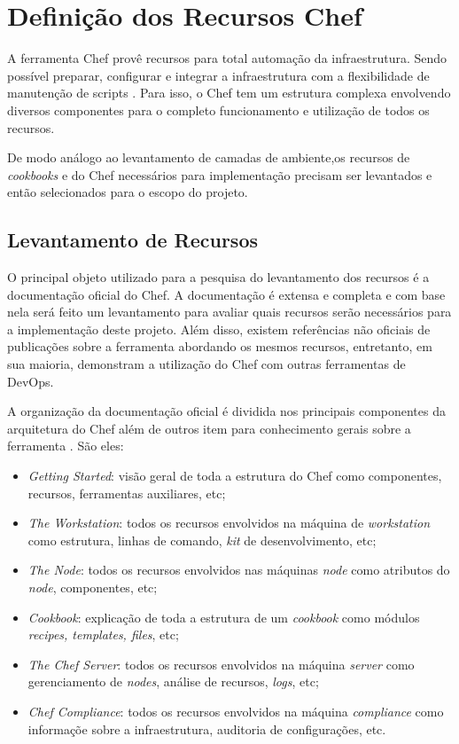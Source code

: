 \section{Definição dos Recursos Chef}
\label{sec:rec-chef}

A ferramenta Chef provê recursos para total automação da infraestrutura.
Sendo possível preparar, configurar e integrar a infraestrutura com a
flexibilidade de manutenção de scripts \cite{sharma:2015}. Para isso, o
Chef tem um estrutura complexa envolvendo diversos componentes para
o completo funcionamento e utilização de todos os recursos.

De modo análogo ao levantamento de camadas de ambiente,os recursos
de \textit{cookbooks} e do Chef necessários para implementação precisam
ser levantados e então selecionados para o escopo do projeto.

\subsection{Levantamento de Recursos}
\label{sec:levn-rec}

O principal objeto utilizado para a pesquisa do levantamento dos recursos
é a documentação oficial do Chef. A documentação é extensa e completa e
com base nela será feito um levantamento para avaliar quais recursos
serão necessários para a implementação deste projeto. Além disso, existem
referências não oficiais de publicações sobre a ferramenta abordando os
mesmos recursos, entretanto, em sua maioria, demonstram a utilização do
Chef com outras ferramentas de DevOps.

A organização da documentação oficial é dividida nos principais componentes
da arquitetura do Chef além de outros item para conhecimento gerais sobre a
ferramenta \cite{chefdoc:2016}. São eles:

\begin{itemize}
  \item \textit{Getting Started}: visão geral de toda a estrutura do Chef
    como componentes, recursos, ferramentas auxiliares, etc;
  \item \textit{The Workstation}: todos os recursos envolvidos na máquina de \textit{workstation}
    como estrutura, linhas de comando, \textit{kit} de desenvolvimento, etc;
  \item \textit{The Node}: todos os recursos envolvidos nas máquinas \textit{node}
    como atributos do \textit{node}, componentes, etc;
  \item \textit{Cookbook}: explicação de toda a estrutura de um \textit{cookbook}
    como módulos \textit{recipes, templates, files}, etc;
  \item \textit{The Chef Server}: todos os recursos envolvidos na máquina \textit{server}
    como gerenciamento de \textit{nodes}, análise de recursos, \textit{logs}, etc;
  \item \textit{Chef Compliance}: todos os recursos envolvidos na máquina \textit{compliance}
    como informaçõe sobre a infraestrutura, auditoria de configurações, etc.
\end{itemize}

